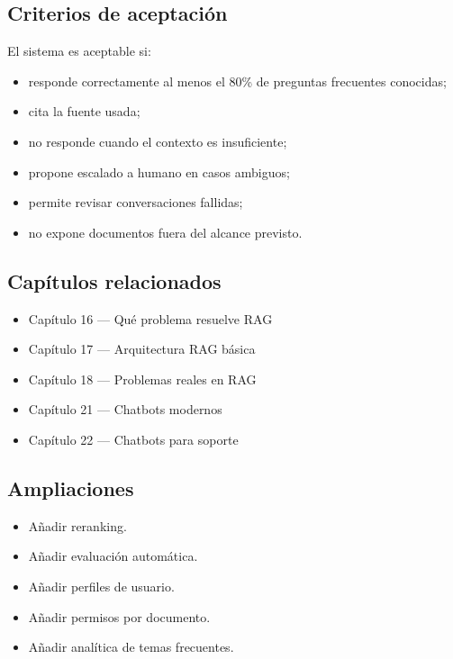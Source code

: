 \subsection{Criterios de aceptación}\label{criterios-de-aceptaciuxf3n}

El sistema es aceptable si:

\begin{itemize}
\tightlist
\item
  responde correctamente al menos el 80\% de preguntas frecuentes
  conocidas;
\item
  cita la fuente usada;
\item
  no responde cuando el contexto es insuficiente;
\item
  propone escalado a humano en casos ambiguos;
\item
  permite revisar conversaciones fallidas;
\item
  no expone documentos fuera del alcance previsto.
\end{itemize}

\subsection{Capítulos relacionados}\label{capuxedtulos-relacionados}

\begin{itemize}
\tightlist
\item
  Capítulo 16 --- Qué problema resuelve RAG
\item
  Capítulo 17 --- Arquitectura RAG básica
\item
  Capítulo 18 --- Problemas reales en RAG
\item
  Capítulo 21 --- Chatbots modernos
\item
  Capítulo 22 --- Chatbots para soporte
\end{itemize}

\subsection{Ampliaciones}\label{ampliaciones}

\begin{itemize}
\tightlist
\item
  Añadir reranking.
\item
  Añadir evaluación automática.
\item
  Añadir perfiles de usuario.
\item
  Añadir permisos por documento.
\item
  Añadir analítica de temas frecuentes.
\end{itemize}

